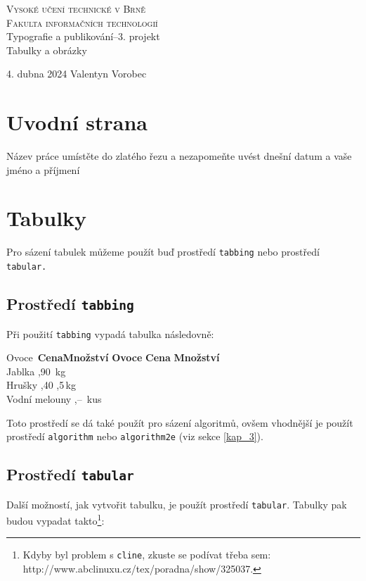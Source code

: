\documentclass[a4paper, 11pt]{article}
\begin{document}
\begin{titlepage}
    \begin{center}
        \textsc{\Huge{Vysoké učení technické v Brně}\\[0.5em]
        \huge{Fakulta informačních technologií}}\\
        \LARGE
        Typografie a publikování--3. projekt\\
        \Huge
        Tabulky a obrázky\\
    \end{center}
    {\LARGE 4. dubna 2024 \hfill
    Valentyn Vorobec}
\end{titlepage}

\section{Uvodní strana}
Název práce umístěte do zlatého řezu a nezapomeňte uvést dnešní datum a vaše jméno a příjmení

\section{Tabulky}
Pro sázení tabulek můžeme použít buď prostředí \texttt{tabbing} nebo prostředí \texttt{tabular.}

\subsection{Prostředí \texttt{tabbing}}
Při použití \texttt{tabbing} vypadá tabulka následovně:

\begin{tabbing}
    Ovoce\qquad\qquad\ \= \textbf{Cena}\quad \= \textbf{Množství} \kill
    \textbf{Ovoce} \> \textbf{Cena} \> \textbf{Množství} \\
    Jablka ,90 \,kg \\
    Hrušky ,40 ,5\,kg \\
    Vodní melouny ,-- \,kus \\
\end{tabbing}

\noindent
Toto prostředí se dá také použít pro sázení algoritmů, ovšem vhodnější je použít prostředí \texttt{algorithm} nebo \texttt{algorithm2e} (viz sekce \ref{kap_3}).

\subsection{Prostředí \texttt{tabular}}
Další možností, jak vytvořit tabulku, je použít prostředí \texttt{tabular}. Tabulky pak budou vypadat takto\footnote{Kdyby byl problem s \texttt{cline}, zkuste se podívat třeba sem: http://www.abclinuxu.cz/tex/poradna/show/325037.}:
\end{document}
